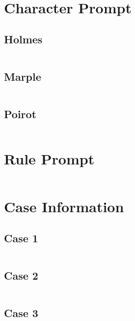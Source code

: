 \documentclass{article}
\begin{document}
\begin{appendices}
\section{Character Prompt}

\subsection{Holmes}
    \inputminted{yaml}{../prompts/holmes.yaml}

\subsection{Marple}
    \inputminted{yaml}{../prompts/marple.yaml}
    
\subsection{Poirot}
    \inputminted{yaml}{../prompts/poirot.yaml}


\section{Rule Prompt}
    \inputminted{yaml}{../prompts/rule_collab.yaml}


\section{Case Information}


\subsection{Case 1}
    \inputminted{yaml}{../cases/case1.yaml}
\subsection{Case 2}
    \inputminted{yaml}{../cases/case2.yaml}
\subsection{Case 3}
    \inputminted{yaml}{../cases/case3.yaml}



\end{appendices}
\end{document}

